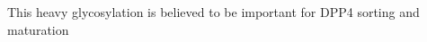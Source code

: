 This heavy glycosylation is believed to be important for DPP4 sorting and  maturation\cite{Matter_1991}